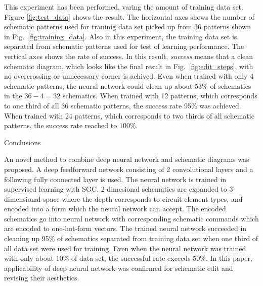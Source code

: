 \documentclass[twocolumn]{article}
\makeatletter
\def\section{\@startsection {section}{1}{\z@}{20pt plus 2pt minus 2pt}
{8pt plus 2pt minus 2pt}{\centering\normalsize\sc
\edef\@svsec{\thesection.\ }}}
\def\thesection{\Roman{section}}
\makeatother
\begin{document}
This experiment has been performed, varing the amount of training data set.
Figure \ref{fig:test_data} shows the result.
The horizontal axes shows the number of schematic patterns
used for traninig data set picked up from 36 patterns
shown in Fig.\ \ref{fig:training_data}.
Also in this experiment,
the training data set is separated from schematic patterns
used for test of learning performance.
The vertical axes shows the rate of success.
In this result, {\it success} means that a clean schematic diagram,
which looks like the final result in Fig.\ \ref{fig:edit_steps},
with no overcrossing or unnecessary corner is achived.
Even when trained with only 4 schematic patterns,
the neural network could clean up about 53\% of schematics
in the $36 - 4 = 32$ schematics.
When trained with 12 patterns,
which corresponds to one third of all 36 schematic patterns,
the success rate 95\% was achieved.
When trained with 24 patterns,
which corresponds to two thirds of all schematic patterns,
the success rate reached to 100\%.

\section{Conclusions}

An novel method to combine deep neural network and schematic diagrams
was proposed.
A deep feedforward network consisting of 2 convolutional layers
and a following fully connected layer is used.
The neural network is trained in supervised learning with SGC.
2-dimesional schematics are expanded to 3-dimensional space
where the depth corresponds to circuit element types,
and encoded into a form which the neural network can accept.
The encoded schematics go into neural network with corresponding
schematic commands which are encoded to one-hot-form vectors.
The trained neural network succeeded in cleaning up 95\% of schematics
separated from training data set when one third of all data set were used
for training.
Even when the neural network was trained with only about 10\% of data set,
the successful rate exceeds 50\%.
In this paper,
applicability of deep neural network was confirmed
for schematic edit and revising their aesthetics.

\end{document}
